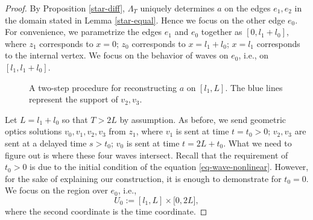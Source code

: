 \documentclass[10pt,a4paper]{amsart}
\begin{document}
\begin{proof}
By Proposition \ref{star-diff}, $\Lambda_T$ uniquely determines $a$ on the edges $e_1,e_2$ in the domain stated in Lemma \ref{star-equal}. Hence we focus on the other edge $e_0$.
For convenience, we parametrize the edges $e_1$ and $e_0$ together as $[0,l_1+l_0]$, where $z_1$ corresponds to $x=0$; $z_0$ corresponds to $x=l_1+l_0$; $x=l_1$ corresponds to the internal vertex.
We focus on the behavior of waves on $e_0$, i.e., on $[l_1,l_1+l_0]$.


\begin{figure}
    \begin{minipage}{0.47\textwidth}
        
        \caption{The support of the wave $v_1$ (translated so that the wave starts from the origin).}
        \label{v1}
    \end{minipage}
    \begin{minipage}{0.47\textwidth}
        
        \caption{A two-step procedure for reconstructing $a$ on $[l_1,L]$. The blue lines represent the support of $v_2,v_3$.}
       \label{procedure}
    \end{minipage}
\end{figure}


Let $L=l_1+l_0$ so that $T>2L$ by assumption.
As before, we send geometric optics solutions $v_0,v_1,v_2,v_3$ from $z_1$, where $v_1$ is sent at time $t=t_0>0$; $v_2,v_3$ are sent at a delayed time $s>t_0$;
$v_0$ is sent at time $t=2L+t_0$.
What we need to figure out is where these four waves intersect.
{Recall that the requirement of $t_0>0$ is due to the initial condition of the equation \eqref{eq-wave-nonlinear}.
However, for the sake of explaining our construction, it is enough to demonstrate for $t_0=0$.}
We focus on the region over $e_0$, i.e., $$U_0:=[l_1,L]\times \mathbb [0,2L],$$ 
where the second coordinate is the time coordinate.


\end{proof}
\end{document}
